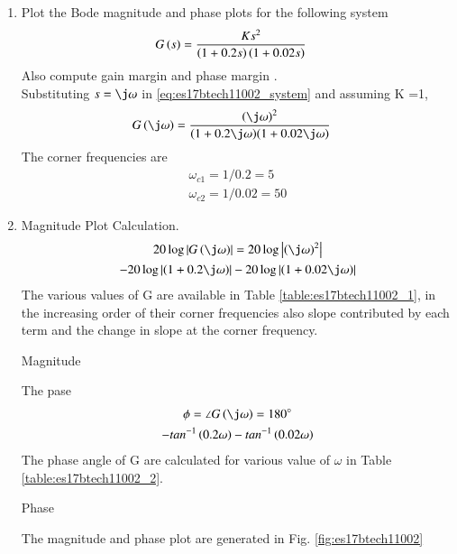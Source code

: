 \begin{enumerate}[label=\thesection.\arabic*.,ref=\thesection.\theenumi]
\item Plot the Bode magnitude and phase plots for the following system
\begin{align}
G\left(s\right) &= \frac{Ks^2}{{\left(1+0.2s\right){\left(1+0.02s\right)}}}
\label{eq:es17btech11002_system}
\end{align}
Also compute gain margin and phase margin .
\\
\solution Substituting $s=\j\omega$ in   \eqref{eq:es17btech11002_system} and 
assuming K =1,
\begin{align}
\label{eq:es17btech11002_gain}
G\brak{\j\omega}&=\frac{\brak{\j\omega}^2}{{\brak{1+0.2\j\omega}}{\brak{1+0.02\j\omega}}}
\end{align}
The corner frequencies are
\begin{align}
\omega_{c1}=1/0.2 = 5
\\
\omega_{c2}=1/0.02 = 50
\end{align}
\item Magnitude Plot Calculation.
\\
\solution
\begin{multline}
20\log\abs{G\brak{\j\omega}} = 20\log\abs{\brak{\j\omega}^2}\\-20\log\abs{\brak{1+0.2\j\omega}} -20\log\abs{\brak{1+0.02\j\omega}}
\end{multline}
The various values of G\brak{\j\omega} are available in Table  \ref{table:es17btech11002_1}, in the increasing order of their corner frequencies also slope contributed by each term and the change in slope at the corner frequency.
\begin{table}[!ht]
\centering

\caption{Magnitude}
\label{table:es17btech11002_1}
\end{table}
The pase
\begin{multline}
\phi = \angle{G\brak{\j\omega}}= 180\degree
\\-tan^{-1}\brak{0.2\omega}-tan^{-1}\brak{0.02\omega}
\end{multline}
The phase angle of G\brak{\j\omega} are calculated for various value of $\omega$ in Table \ref{table:es17btech11002_2}.
\begin{table}[!ht]
\centering

\caption{Phase}
\label{table:es17btech11002_2}
\end{table}
The magnitude and phase plot are generated in Fig. \ref{fig:es17btech11002}

\end{enumerate}
